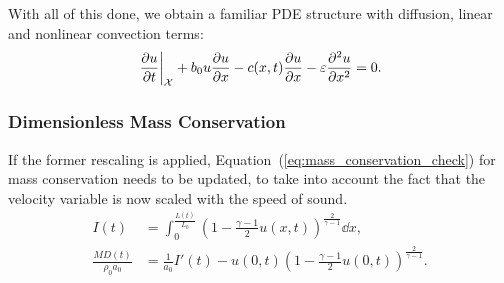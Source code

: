 \documentclass[../../thesis.tex]{subfiles}
\newcommand{\aleX}{\ensuremath{\mathcal{X}}}
\begin{document}
With all of this done, we obtain a familiar PDE structure with diffusion, 
linear and nonlinear convection terms:
\begin{equation}
    \left.\frac{\partial u}{\partial t}\right|_{\aleX} 
    + b_0 u \frac{\partial u}{\partial x} 
    - c(x,t)\frac{\partial u}{\partial x} 
    - \varepsilon  \pdv[2]{u}{x} = 0.
\end{equation}

\subsubsection{Dimensionless Mass Conservation}
If the former rescaling is applied, Equation~(\ref{eq:mass_conservation_check}) 
for mass conservation needs to be updated, 
to take into account the fact that the velocity variable is now scaled with the speed of sound.
\begin{subequations}
    \begin{align}
        I(t) &= \int_{0}^{\frac{L(t)}{L_0}} 
        \left(1 - \frac{\gamma-1}{2}u(x,t)\right)^{\frac{2}{\gamma-1}} 
        \dd x, 
        \\
        \frac{MD(t)}{\rho_0 a_0} &= \frac{1}{a_0}I'(t) - u(0,t) \left(1 - \frac{\gamma-1}{2}u(0,t)\right)^{\frac{2}{\gamma-1}}.
    \end{align}    
\end{subequations}


\end{document}
